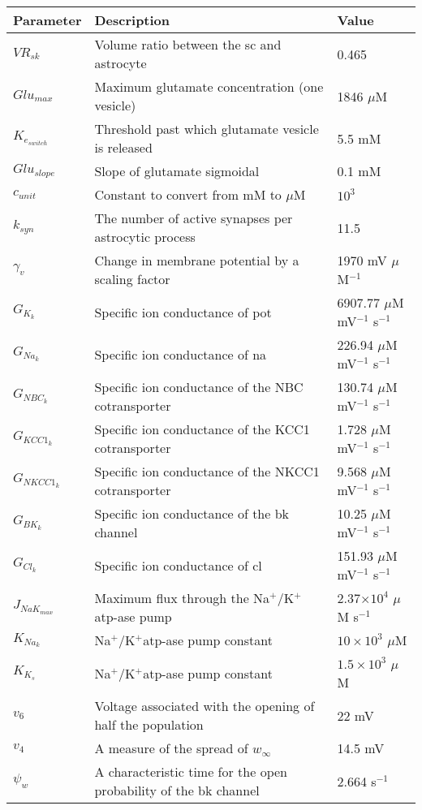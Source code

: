 \documentclass[11pt]{elsarticle}
\newcommand{\sodpot}{Na$^+$/K$^+$\xspace}
\newcommand{\mus}{$\mu$M s$^{-1}$\xspace}
\newcommand{\uM}{$\mu$M\xspace}
\newcommand{\n}{$^{-1}$\xspace}
\newcommand{\e}[1]{\times 10^{#1}}
\newcommand{\psec}{s$^{-1}$\xspace}
\newcommand{\na}{\gls{na}\xspace}
\newcommand{\pot}{\gls{pot}\xspace}
\newcommand{\cl}{\gls{cl}\xspace}
\begin{document}
\begin{longtable}[h!]{ p{0.1\linewidth}   p{0.68\linewidth}   p{0.22\linewidth} }
	\hline
	Parameter & Description & Value \\
	\hline
$VR_{sk}$ 			& Volume ratio between the \gls{sc} and astrocyte & 0.465 \\
$Glu_{max}$ 		& Maximum glutamate concentration (one vesicle) 		& 1846 $\mu$M   \\
$K_{e_{switch}}$	& Threshold past which glutamate vesicle is released		& 5.5 mM \\
$Glu_{slope}$		& Slope of glutamate sigmoidal				& 0.1 mM	 \\
$c_{unit}$			& Constant to convert from mM to \uM & $10^3$ \\
$k_{syn}$			& The number of active synapses per astrocytic process					& 11.5		 \\
$\gamma_v$				& Change in membrane potential by a scaling factor					& 1970 mV \uM\n \\
$G_{K_{k}}$ 	& Specific ion conductance of \pot 			& 6907.77 $\mu$M mV\n \psec  \\
$G_{Na_k}$ 		& Specific ion conductance of \na 		& 226.94  $\mu$M mV\n \psec   \\
$G_{NBC_k}$ 	& Specific ion conductance of the NBC cotransporter			& 130.74 $\mu$M mV\n \psec  \\
$G_{KCC1_k}$ 	& Specific ion conductance of the KCC1 cotransporter					& 1.728  $\mu$M mV\n \psec  \\
$G_{NKCC1_k}$ 	& Specific ion conductance of the NKCC1 cotransporter	 				& 9.568 $\mu$M mV\n \psec \\
$G_{BK_k}$ 		& Specific ion conductance of the \gls{bk} channel		& 10.25 $\mu$M mV\n \psec  \\
$G_{Cl_k}$ 		& Specific ion conductance of \cl 		&   151.93  $\mu$M mV\n \psec \\
$J_{NaK_{max}}$ & Maximum flux through the \sodpot \gls{atp}-ase pump							& 2.37$\e{4}$ \mus  \\
$K_{Na_k}$ & \sodpot \gls{atp}-ase pump constant							& $10\e{3}$ \uM  \\
$K_{K_s}$ & \sodpot \gls{atp}-ase pump constant							& $1.5\e{3}$ \uM  \\
$v_{6}$			& Voltage associated with the opening of half the population		& 22 mV  \\
$v_{4}$			& A measure of the spread of $w_{\infty}$	& 14.5 mV \\
$ \psi_{w}$    	& A characteristic time for the open probability of the \gls{bk} channel		& 2.664 \psec  \\

\end{longtable}
\end{document}

